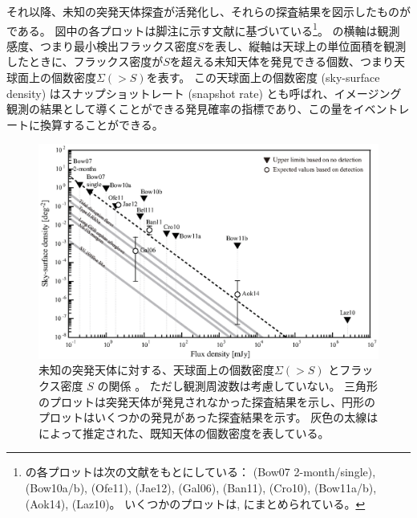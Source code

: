 {それ以降、未知の突発天体探査が活発化し、それらの探査結果を図示したものがである。
図中の各プロットは脚注に示す文献に基づいている\footnote{
の各プロットは次の文献をもとにしている： \citealt{2007ApJ...666..346B} (Bow07 2-month/single), \citealt{2010ApJ...725.1792B} (Bow10a/b), \citealt{2011ApJ...740...65O} (Ofe11), \citealt{2012AJ....143...96J} (Jae12), \citealt{2006ApJ...639..331G} (Gal06), \citealt{2011MNRAS.412..634B} (Ban11), \citealt{2010ApJ...719...45C} (Cro10),  \citealt{2011ApJ...728L..14B} (Bow11a/b), \citealt{2014ApJ...781...10A} (Aok14), \citealt{2010AJ....140.1995L} (Laz10)。
いくつかのプロットは\citet{2011MNRAS.415....2B}, \citet{2012ApJ...747...70F}にまとめられている。
}。
の横軸は観測感度、つまり最小検出フラックス密度$S$を表し、縦軸は天球上の単位面積を観測したときに、フラックス密度が$S$を超える未知天体を発見できる個数、つまり天球面上の個数密度$\varSigma (>S)$を表す。
この天球面上の個数密度 (sky-surface density) はスナップショットレート (snapshot rate) とも呼ばれ、イメージング観測の結果として導くことができる発見確率の指標であり、この量をイベントレートに換算することができる。
\begin{figure}
	\centering
	\includegraphics[width=1\textwidth]{transients/transients.s3.unknowns.rate.eps}
	\caption{未知の突発天体に対する、天球面上の個数密度$\varSigma (>S)$ とフラックス密度 $S$ の関係 \citep{2014ApJ...781...10A}。
	ただし観測周波数は考慮していない。
	三角形のプロットは突発天体が発見されなかった探査結果を示し、円形のプロットはいくつかの発見があった探査結果を示す。
	灰色の太線は\citet{2012ApJ...747...70F}によって推定された、既知天体の個数密度を表している。}
	\label{fig:transients.s3.unknowns.rate}
\end{figure}%

}
